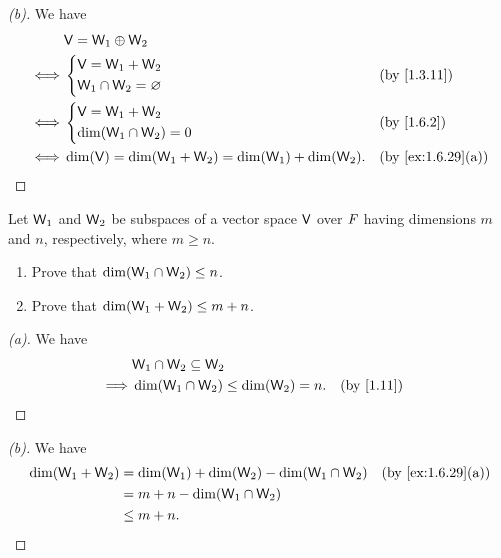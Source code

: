 \begin{proof}[(b)]
  We have
  \begin{align*}
         & \V = \W_1 \oplus \W_2                                                                        \\
    \iff & \begin{dcases}
             \V = \W_1 + \W_2 \\
             \W_1 \cap \W_2 = \varnothing
           \end{dcases}                            &  & \text{(by \cref{1.3.11})}                       \\
    \iff & \begin{dcases}
             \V = \W_1 + \W_2 \\
             \dim(\W_1 \cap \W_2) = 0
           \end{dcases}                                &  & \text{(by \cref{1.6.2})}                    \\
    \iff & \dim(\V) = \dim(\W_1 + \W_2) = \dim(\W_1) + \dim(\W_2). &  & \text{(by \cref{ex:1.6.29}(a))}
  \end{align*}
\end{proof}

\setcounter{ex}{30}
\begin{ex}\label{ex:1.6.31}
  Let \(\mathsf{W}_1\) and \(\mathsf{W}_2\) be subspaces of a vector space \(\mathsf{V}\) over \(\mathit{F}\) having dimensions \(m\) and \(n\), respectively, where \(m \geq n\).
  \begin{enumerate}
    \item Prove that \(\dim(\mathsf{W}_1 \cap \mathsf{W}_2) \leq n\).
    \item Prove that \(\dim(\mathsf{W}_1 + \mathsf{W}_2) \leq m + n\).
  \end{enumerate}
\end{ex}

\begin{proof}[(a)]
  We have
  \begin{align*}
             & \W_1 \cap \W_2 \subseteq \W_2                                          \\
    \implies & \dim(\W_1 \cap \W_2) \leq \dim(\W_2) = n. &  & \text{(by \cref{1.11})}
  \end{align*}
\end{proof}

\begin{proof}[(b)]
  We have
  \begin{align*}
    \dim(\W_1 + \W_2) & = \dim(\W_1) + \dim(\W_2) - \dim(\W_1 \cap \W_2) &  & \text{(by \cref{ex:1.6.29}(a))} \\
                      & = m + n - \dim(\W_1 \cap \W_2)                                                        \\
                      & \leq m + n.
  \end{align*}
\end{proof}

